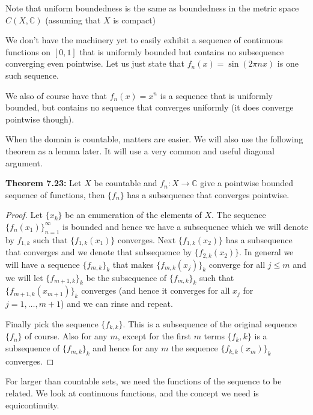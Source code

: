 \documentclass[12pt]{book}
\newcommand{\C}{{\mathbb{C}}}
\theoremstyle{plain}
\theoremstyle{remark}
\theoremstyle{definition}
\theoremstyle{exercise}
\theoremstyle{example}
\begin{document}
\medskip

Note that uniform boundedness is the same as boundedness in the metric space
$C(X,\C)$ (assuming that $X$ is compact)

\medskip

We don't have the machinery yet to easily exhibit
a sequence of continuous functions
on $[0,1]$ that is uniformly bounded but contains no subsequence converging
even pointwise.  Let us just state that $f_n(x) = \sin (2\pi n x)$ is one
such sequence.

\medskip

We also of course have that $f_n(x)=x^n$ is a sequence that is uniformly
bounded, but contains no sequence that converges uniformly (it does converge
pointwise though).

\medskip

When the domain is countable, matters are easier.  We will also use the
following theorem as a lemma later.  It will use a very common and useful
diagonal argument.

\medskip

\textbf{Theorem 7.23:}
Let $X$ be countable and $f_n \colon X \to \C$ give a pointwise bounded
sequence of functions, then $\{ f_n \}$ has a subsequence that converges
pointwise.

\begin{proof}
Let $\{ x_k \}$ be an enumeration of the elements of $X$.
The sequence $\{ f_n(x_1) \}_{n=1}^\infty$ is bounded and hence
we have a subsequence which we will denote by
$f_{1,k}$ such that $\{ f_{1,k}(x_1) \}$ converges.
Next $\{ f_{1,k}(x_2) \}$ has a subsequence that converges and
we denote that subsequence by
$\{ f_{2,k}(x_2) \}$.  In general we will have a sequence $\{ f_{m,k} \}_k$
that makes $\{ f_{m,k}(x_j) \}_k$ converge for all $j \leq m$ and we will
let $\{ f_{m+1,k} \}_k$ be the subsequence of $\{ f_{m,k} \}_k$
such that
$\{ f_{m+1,k}(x_{m+1}) \}_k$ converges (and hence it converges for all
$x_j$ for $j=1,\ldots,m+1$) and we can rinse and repeat.

Finally pick the sequence
$\{ f_{k,k} \}$.  This is a subsequence of the original sequence $\{ f_n \}$
of course.  Also for any $m$,
except for the first $m$ terms $\{ f_k,k \}$ is a subsequence of $\{ f_{m,k} \}_k$
and hence for any $m$ the sequence $\{ f_{k,k}(x_m) \}_k$ converges.
\end{proof}

\medskip

For larger than countable sets,
we need the functions of the sequence to be related.  We look at
continuous functions, and the concept we need is equicontinuity.
\end{document}
